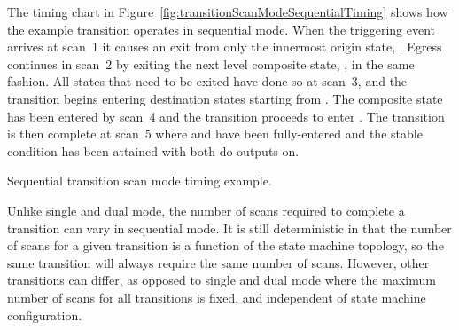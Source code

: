 The timing chart in Figure~\ref{fig:transitionScanModeSequentialTiming}
shows how the example transition operates in sequential mode.
When the triggering event arrives at scan~1 it causes an exit from only the
innermost origin state, . Egress continues in scan~2
by exiting the next level composite state, ,
in the same fashion. All states that need to be exited have done so at scan~3,
and the transition begins entering destination states starting from
. The composite state  has been entered
by scan~4 and the transition proceeds to enter .
The transition is then complete at scan~5 where  and
 have been fully-entered and the stable condition has
been attained with both do outputs on.

               {Sequential transition scan mode timing example.}

Unlike single and dual mode, the number of scans required to complete a
transition can vary in sequential mode. It is still deterministic in that
the number of scans for a given transition is a function of the state
machine topology, so the same transition will always require the same number
of scans. However, other transitions can differ, as opposed to single and
dual mode where the maximum number of scans for all transitions is fixed,
and independent of state machine configuration.
